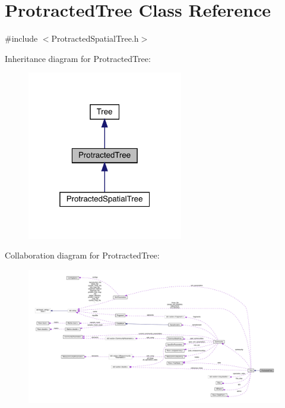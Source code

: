 \hypertarget{class_protracted_tree}{}\section{Protracted\+Tree Class Reference}
\label{class_protracted_tree}


{\ttfamily \#include $<$Protracted\+Spatial\+Tree.\+h$>$}



Inheritance diagram for Protracted\+Tree\+:\nopagebreak
\begin{figure}[H]
\begin{center}
\leavevmode
\includegraphics[width=193pt]{class_protracted_tree__inherit__graph}
\end{center}
\end{figure}


Collaboration diagram for Protracted\+Tree\+:
\nopagebreak
\begin{figure}[H]
\begin{center}
\leavevmode
\includegraphics[width=350pt]{class_protracted_tree__coll__graph}
\end{center}
\end{figure}
